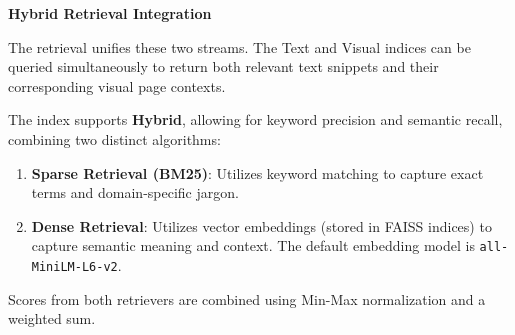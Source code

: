 \textbf{Hybrid Retrieval Integration}

The retrieval unifies these two streams. 
The Text and Visual indices can be queried simultaneously to return both relevant text snippets and their corresponding visual page contexts.

The index supports \textbf{Hybrid}, allowing for keyword precision and semantic recall, combining two distinct algorithms:

\begin{enumerate}
    \item \textbf{Sparse Retrieval (BM25)}: Utilizes keyword matching to capture exact terms and domain-specific jargon.
    \item \textbf{Dense Retrieval}: Utilizes vector embeddings (stored in FAISS indices) to capture semantic meaning and context. The default embedding model is \texttt{all-MiniLM-L6-v2}.
\end{enumerate}

Scores from both retrievers are combined using Min-Max normalization and a weighted sum.






\newpage